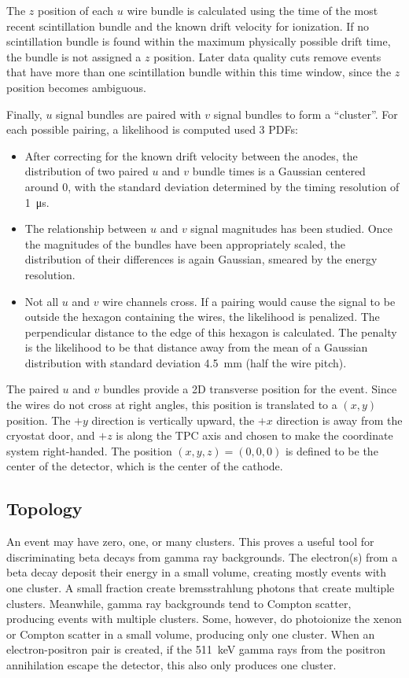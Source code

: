 \documentclass[herrin-thesis.tex]{subfiles}
\begin{document}
The \(z\) position of each \(u\) wire bundle is calculated using the time of the most recent scintillation bundle and the known drift velocity for ionization. If no scintillation bundle is found within the maximum physically possible drift time, the bundle is not assigned a \(z\) position. Later data quality cuts remove events that have more than one scintillation bundle within this time window, since the \(z\) position becomes ambiguous.

Finally, \(u\) signal bundles are paired with \(v\) signal bundles to form a ``cluster''. For each possible pairing, a likelihood is computed used 3 PDFs:
\begin{itemize}
\item After correcting for the known drift velocity between the anodes, the distribution of two paired \(u\) and \(v\) bundle times is a Gaussian centered around 0, with the standard deviation determined by the timing resolution of \SI{1}{\micro\s}.
\item The relationship between \(u\) and \(v\) signal magnitudes has been studied. Once the magnitudes of the bundles have been appropriately scaled, the distribution of their differences is again Gaussian, smeared by the energy resolution.
\item Not all \(u\) and \(v\) wire channels cross. If a pairing would cause the signal to be outside the hexagon containing the wires, the likelihood is penalized. The perpendicular distance to the edge of this hexagon is calculated. The penalty is the likelihood to be that distance away from the mean of a Gaussian distribution with standard deviation \SI{4.5}{\mm} (half the wire pitch).
\end{itemize}

The paired \(u\) and \(v\) bundles provide a 2D transverse position for the event. Since the wires do not cross at right angles, this position is translated to a \((x, y)\) position. The \(+y\) direction is vertically upward, the \(+x\) direction is away from the cryostat door, and \(+z\) is along the TPC axis and chosen to make the coordinate system right-handed. The position \((x, y, z) = (0, 0, 0)\) is defined to be the center of the detector, which is the center of the cathode.

\subsection{Topology}
\label{sec:data_topology}
An event may have zero, one, or many clusters. This proves a useful tool for discriminating beta decays from gamma ray backgrounds. The electron(s) from a beta decay deposit their energy in a small volume, creating mostly events with one cluster. A small fraction create bremsstrahlung photons that create multiple clusters. Meanwhile, gamma ray backgrounds tend to Compton scatter, producing events with multiple clusters. Some, however, do photoionize the xenon or Compton scatter in a small volume, producing only one cluster. When an electron-positron pair is created, if the \SI{511}{\keV} gamma rays from the positron annihilation escape the detector, this also only produces one cluster.
\end{document}

